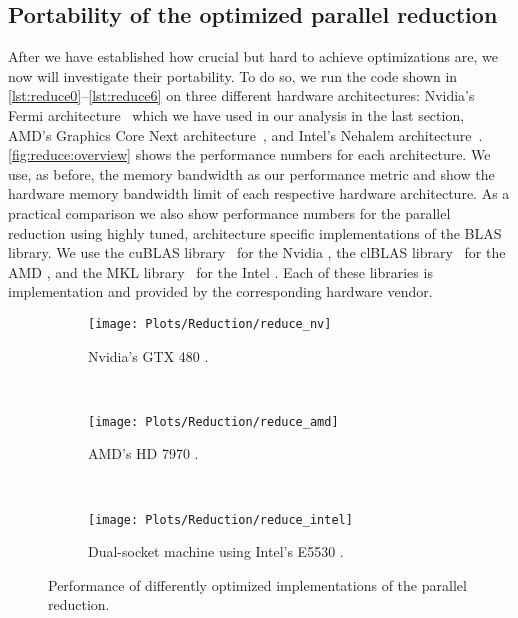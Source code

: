 \subsection{Portability of the optimized parallel reduction}
After we have established how crucial but hard to achieve optimizations are, we now will investigate their portability.
To do so, we run the code shown in \autoref{lst:reduce0}--\ref{lst:reduce6} on three different hardware architectures:
Nvidia's Fermi \GPU architecture~\cite{CUDAFermi2009} which we have used in our analysis in the last section, AMD's Graphics Core Next \GPU architecture~\cite{AMDGCN2012}, and Intel's Nehalem \CPU architecture~\cite{IntelNehalem2008}.
\autoref{fig:reduce:overview} shows the performance numbers for each architecture.
We use, as before, the memory bandwidth as our performance metric and show the hardware memory bandwidth limit of each respective hardware architecture.
As a practical comparison we also show performance numbers for the parallel reduction using highly tuned, architecture specific implementations of the BLAS library.
We use the cuBLAS library~\cite{cuBLAS} for the Nvidia \GPU, the clBLAS library~\cite{clBLAS} for the AMD \GPU, and the MKL library~\cite{MKL} for the Intel \CPU.
Each of these libraries is implementation and provided by the corresponding hardware vendor.

\begin{figure}[p]
  \centering
\begin{subfigure}{\linewidth}
  \texttt{[image: Plots/Reduction/reduce\_nv]}
  \caption{Nvidia's GTX 480 \GPU.}
  \label{fig:reduce:nvidia}
\end{subfigure}\\
\begin{subfigure}{\linewidth}
  \texttt{[image: Plots/Reduction/reduce\_amd]}
  \caption{AMD's HD 7970 \GPU.}
  \label{fig:reduce:amd}
\end{subfigure}\\
\begin{subfigure}{\linewidth}
  \texttt{[image: Plots/Reduction/reduce\_intel]}
    \caption{Dual-socket machine using Intel's E5530 \CPU.}
  \label{fig:reduce:intel}
\end{subfigure}
  \caption{Performance of differently optimized implementations of the parallel reduction.}
  \label{fig:reduce:overview}
\end{figure}


